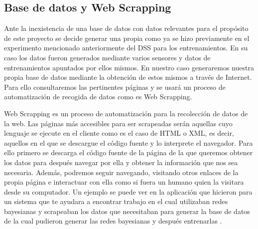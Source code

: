 \subsection{Base de datos y Web Scrapping}
Ante la inexistencia de una base de datos con datos relevantes para el propósito de este proyecto
 se decide generar una propia como ya se hizo previamente en el experimento mencionado anteriormente
 del \acs{DSS} para los entrenamientos. En su caso los datos fueron generados mediante varios sensores y
 datos de entrenamientos apuntados por ellos mismos. En nuestro caso generaremos nuestra propia
 base de datos mediante la obtención de estos mismos a través de Internet. Para ello consultaremos
 las pertinentes páginas y se usará un proceso de automatización de recogida de datos como es
 Web Scrapping.

Web Scrapping es un proceso de automatización para la recolección de datos de la web. Las páginas
 más accesibles para ser scrapeadas serán aquellas cuyo lenguaje se ejecute en el cliente como
 es el caso de HTML o XML, es decir, aquellos en el que se descargue el código fuente y lo interprete
 el navegador. Para ello primero se descarga el código fuente de la página de la que queremos
 obtener los datos para después navegar por ella y obtener la información que nos sea necesaria.
 Además, podremos seguir navegando, visitando otros enlaces de la propia página e interactuar
 con ella como si fuera un humano quien la visitara desde su computador. Un ejemplo se puede
 ver en la aplicación que hicieron para un sistema que te ayudara a encontrar trabajo en el cual
 utilizaban redes bayesianas y scrapeaban los datos que necesitaban para generar la base de datos
 de la cual pudieron generar las redes bayesianas y después entrenarlas \cite{bayesian}.

